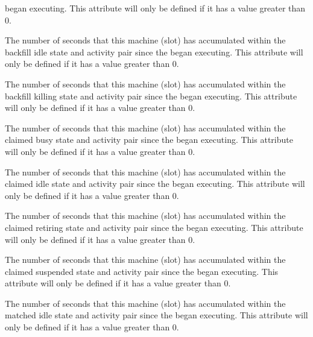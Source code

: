 \begin{description}
began executing.
This attribute will only be defined if it has a value greater than 0.
%
\item[\AdAttr{TotalTimeBackfillIdle}:] The number of seconds
that this machine (slot) has accumulated within the
backfill idle state and activity pair since the 
began executing.
This attribute will only be defined if it has a value greater than 0.
%
\item[\AdAttr{TotalTimeBackfillKilling}:] The number of seconds
that this machine (slot) has accumulated within the
backfill killing state and activity pair since the 
began executing.
This attribute will only be defined if it has a value greater than 0.
%
\item[\AdAttr{TotalTimeClaimedBusy}:] The number of seconds
that this machine (slot) has accumulated within the
claimed busy state and activity pair since the 
began executing.
This attribute will only be defined if it has a value greater than 0.
%
\item[\AdAttr{TotalTimeClaimedIdle}:] The number of seconds
that this machine (slot) has accumulated within the
claimed idle state and activity pair since the 
began executing.
This attribute will only be defined if it has a value greater than 0.
%
\item[\AdAttr{TotalTimeClaimedRetiring}:] The number of seconds
that this machine (slot) has accumulated within the
claimed retiring state and activity pair since the 
began executing.
This attribute will only be defined if it has a value greater than 0.
%
\item[\AdAttr{TotalTimeClaimedSuspended}:] The number of seconds
that this machine (slot) has accumulated within the
claimed suspended state and activity pair since the 
began executing.
This attribute will only be defined if it has a value greater than 0.
%
\item[\AdAttr{TotalTimeMatchedIdle}:] The number of seconds
that this machine (slot) has accumulated within the
matched idle state and activity pair since the 
began executing.
This attribute will only be defined if it has a value greater than 0.

\end{description}
